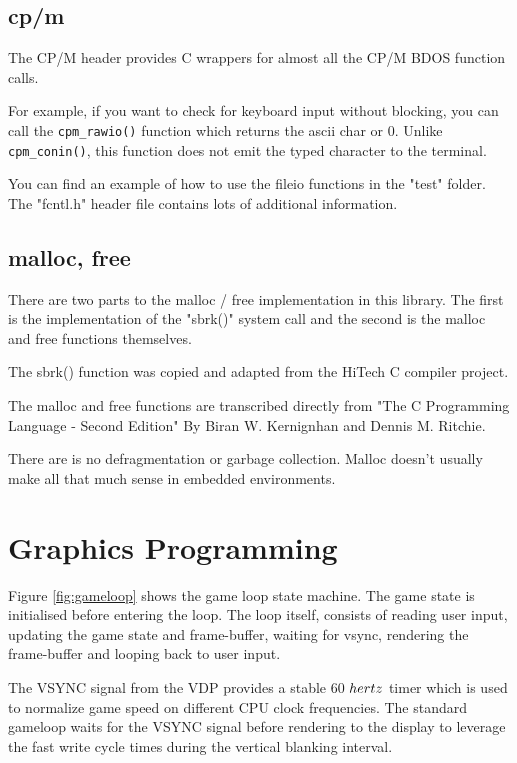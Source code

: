 \documentclass[10pt,a4paper,hidelinks]{article}
\begin{document}
\subsection{cp/m}
The CP/M header provides C wrappers for almost all the CP/M BDOS function calls.

For example, if you want to check for keyboard input without blocking, you can
call the \texttt{cpm\_rawio()} function which returns the ascii char or 0.
Unlike \texttt{cpm\_conin()}, this function does not emit the typed character to
the terminal.

You can find an example of how to use the fileio functions in the "test"
folder.  The "fcntl.h" header file contains lots of additional information.

\break
\subsection{malloc, free}
There are two parts to the malloc / free implementation in this library.  The
first is the implementation of the "sbrk()" system call and the second is the
malloc and free functions themselves.

The sbrk() function was copied and adapted from the HiTech C compiler project.

The malloc and free functions are transcribed directly from "The C Programming
Language - Second Edition" By Biran W. Kernignhan and Dennis M. Ritchie.

There are is no defragmentation or garbage collection.  Malloc doesn't usually
make all that much sense in embedded environments.

\pagebreak
\section{Graphics Programming} \label{graphicsprogramming}

Figure \ref{fig:gameloop} shows the game loop state machine.  The game state is
initialised before entering the loop.  The loop itself, consists of reading user
input, updating the game state and frame-buffer, waiting for vsync, rendering
the frame-buffer and looping back to user input.

The VSYNC signal from the VDP provides a stable 60 ${\\hertz}$ timer which is
used to normalize game speed on different CPU clock frequencies.  The standard
gameloop waits for the VSYNC signal before rendering to the display to leverage
the fast write cycle times during the vertical blanking interval.
\end{document}
